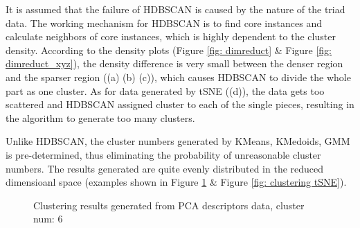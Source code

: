 \documentclass[a4paper]{article}
\begin{document}
It is assumed that the failure of HDBSCAN is caused by the nature of the triad data. The working mechanism for HDBSCAN is to find core instances and calculate neighbors of core instances, which is highly dependent to the cluster density. According to the density plots (Figure \ref{fig: dimreduct} \& Figure \ref{fig: dimreduct_xyz}), the density difference is very small between the denser region and the sparser region ((a) (b) (c)), which causes HDBSCAN to divide the whole part as one cluster. As for data generated by tSNE ((d)), the data gets too scattered and HDBSCAN assigned cluster to each of the single pieces, resulting in the algorithm to generate too many clusters.

Unlike HDBSCAN, the cluster numbers generated by KMeans, KMedoids, GMM is pre-determined, thus eliminating the probability of unreasonable cluster numbers. The results generated are quite evenly distributed in the reduced dimensioanl space (examples shown in Figure \ref{fig: clustering PCA} \& Figure \ref{fig: clustering tSNE}).

\begin{figure}[H]
    \centering
    \caption{Clustering results generated from PCA descriptors data, cluster num: 6}
    \label{fig: clustering PCA}
\end{figure}
\end{document}
